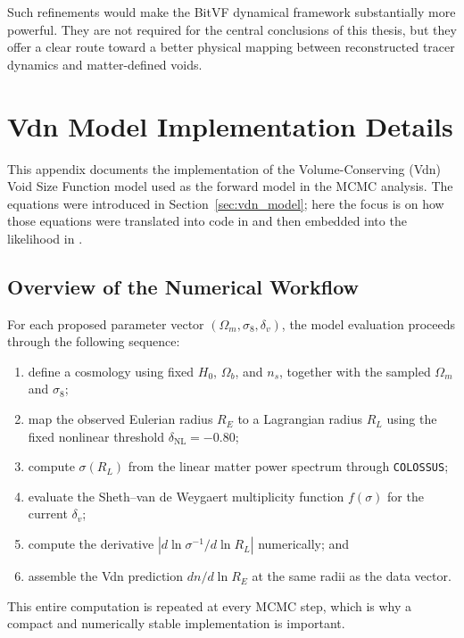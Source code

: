 \documentclass[12pt]{report}
\begin{document}
Such refinements would make the BitVF dynamical framework substantially more powerful. They are not required for the central conclusions of this thesis, but they offer a clear route toward a better physical mapping between reconstructed tracer dynamics and matter-defined voids.


\chapter{Vdn Model Implementation Details}
\label{app:vdn_implementation}

This appendix documents the implementation of the Volume-Conserving (Vdn) Void Size Function model used as the forward model in the MCMC analysis. The equations were introduced in Section~\ref{sec:vdn_model}; here the focus is on how those equations were translated into code in  and then embedded into the likelihood in .

\section{Overview of the Numerical Workflow}

For each proposed parameter vector $(\Omega_m,\sigma_8,\delta_v)$, the model evaluation proceeds through the following sequence:
\begin{enumerate}
    \item define a cosmology using fixed $H_0$, $\Omega_b$, and $n_s$, together with the sampled $\Omega_m$ and $\sigma_8$;
    \item map the observed Eulerian radius $R_E$ to a Lagrangian radius $R_L$ using the fixed nonlinear threshold $\delta_\mathrm{NL}=-0.80$;
    \item compute $\sigma(R_L)$ from the linear matter power spectrum through \texttt{COLOSSUS};
    \item evaluate the Sheth--van de Weygaert multiplicity function $f(\sigma)$ for the current $\delta_v$;
    \item compute the derivative $|d\ln\sigma^{-1}/d\ln R_L|$ numerically; and
    \item assemble the Vdn prediction $dn/d\ln R_E$ at the same radii as the data vector.
\end{enumerate}

This entire computation is repeated at every MCMC step, which is why a compact and numerically stable implementation is important.
\end{document}
